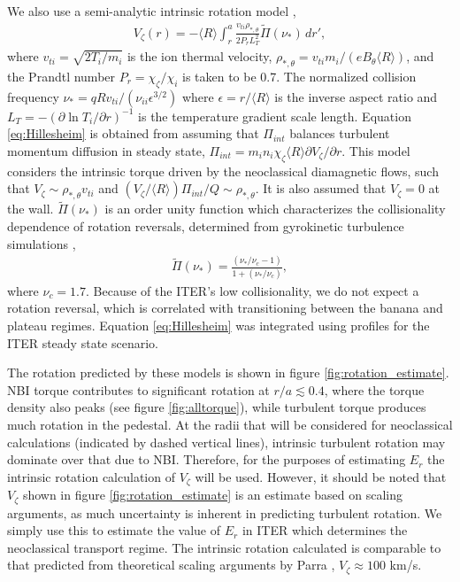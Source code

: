 \documentclass{article}
\numberwithin{figure}{section}
\numberwithin{equation}{section}
\begin{document}
We also use a semi-analytic intrinsic rotation model \cite{Hillesheim2015},
\begin{gather}
V_{\zeta}(r) = - \langle R \rangle \int_{r}^a \frac{v_{ti} \rho_{*,\theta}} {2 P_r L_T^2} \widetilde{\Pi} (\nu_*) \, d r',
\label{eq:Hillesheim}
\end{gather} 
where $v_{ti} = \sqrt{2T_i/m_i}$ is the ion thermal velocity, $\rho_{*,\theta} = v_{ti} m_i/(e B_{\theta} \langle R \rangle) $, and the Prandtl number $P_r = \chi_{\zeta}/\chi_i$ is taken to be 0.7. The normalized collision frequency $\nu_* = q R v_{ti}/(\nu_{ii} \epsilon^{3/2})$ where $\epsilon = r/\langle R \rangle$ is the inverse aspect ratio and $L_T = - \left( \partial \ln T_i/ \partial r \right)^{-1}$ is the temperature gradient scale length. Equation \ref{eq:Hillesheim} is obtained from assuming that $\Pi_{int}$ balances turbulent momentum diffusion in steady state, $\Pi_{int} = m_i n_i \chi_{\zeta} \langle R \rangle \partial V_{\zeta}/\partial r$. This model considers the intrinsic torque driven by the neoclassical diamagnetic flows, such that $V_{\zeta} \sim \rho_{*,\theta} v_{ti}$ and $(V_{\zeta}/\langle R \rangle) \Pi_{int}/Q \sim \rho_{*, \theta}$. It is also assumed that $V_{\zeta} = 0$ at the wall. %
$\widetilde{\Pi} (\nu_*)$ is an order unity function which characterizes the collisionality dependence of rotation reversals, determined from gyrokinetic turbulence simulations \cite{Barnes2013},
\begin{gather}
\widetilde{\Pi} (\nu_*) = \frac{(\nu_*/\nu_c -1)}{1 + (\nu_*/\nu_c)},
\end{gather}
where $\nu_c = 1.7$. Because of the ITER's low collisionality, we do not expect a rotation reversal, which is correlated with transitioning between the banana and plateau regimes. Equation \ref{eq:Hillesheim} was integrated using profiles for the ITER steady state scenario. 

The rotation predicted by these models is shown in figure \ref{fig:rotation_estimate}. NBI torque contributes to significant rotation at $r/a \lesssim 0.4$, where the torque density also peaks (see figure \ref{fig:alltorque}), while turbulent torque produces much rotation in the pedestal.  At the radii that will be considered for neoclassical calculations (indicated by dashed vertical lines), intrinsic turbulent rotation may dominate over that due to NBI. Therefore, for the purposes of estimating $E_r$ the intrinsic rotation calculation of $V_{\zeta}$ will be used. However, it should be noted that $V_{\zeta}$ shown in figure \ref{fig:rotation_estimate} is an estimate based on scaling arguments, as much uncertainty is inherent in predicting turbulent rotation. We simply use this to estimate the value of $E_r$ in ITER which determines the neoclassical transport regime. The intrinsic rotation calculated is comparable to that predicted from theoretical scaling arguments by Parra  \cite{Parra2012}, $V_{\zeta} \approx 100$ km/s. 
\FloatBarrier
\end{document}
